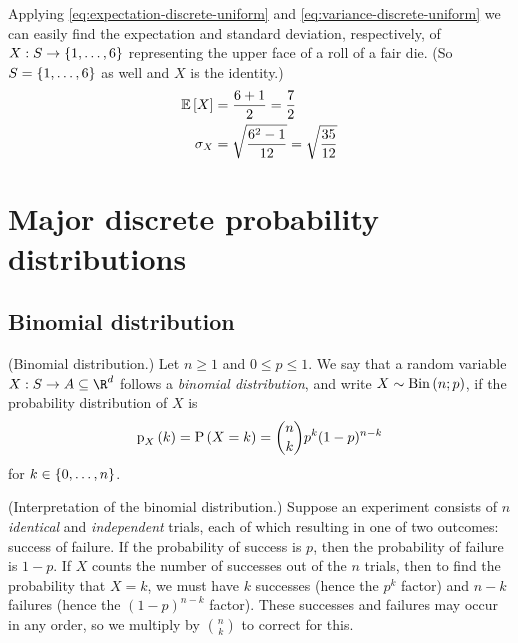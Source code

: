 \documentclass[11pt]{article}
\begin{document}
\begin{rem}
    Applying \eqref{eq:expectation-discrete-uniform} and
    \eqref{eq:variance-discrete-uniform} we can easily find the expectation and
    standard deviation, respectively, of $X : S \to \range{6}$ representing the
    upper face of a roll of a fair die.
    (So $S = \range{6}$ as well and $X$ is the identity.)
    \begin{align*}
        \operatorname{\mathbb{E}}{\left[X\right]}
        &= \frac{6 + 1}{2} = \frac{7}{2} \\
        \sigma_X
        &= \sqrt{
            \frac{6^2 - 1}{12}
        }
        = \sqrt{ \frac{35}{12} }
    \end{align*}
\end{rem}

\section{Major discrete probability distributions}

\subsection{Binomial distribution}

\begin{defn}{(Binomial distribution.)}
    \label{def:binomial-distribution}
    Let $n \geq 1$ and $0 \leq p \leq 1$.
    We say that a random variable $X : S \to A \subseteq \R^d$ follows a
    \emph{binomial distribution}, and write $X \sim \operatorname{Bin}\left(n;p\right)$,
    if the probability distribution of $X$ is
    \begin{equation}
        \label{eq:binomial-distribution}
        \p[X]{k}
        = \P{X = k}
        = \binom{n}{k} p^k (1-p)^{n-k}
    \end{equation}
    for $k \in \range[0]{n}$.
\end{defn}

\begin{rem}{(Interpretation of the binomial distribution.)}
    Suppose an experiment consists of $n$ \emph{identical} and
    \emph{independent} trials, each of which resulting in one of two outcomes:
    success of failure. If the probability of success is $p$, then the
    probability of failure is $1 - p$.
    If $X$ counts the number of successes out of the $n$ trials, then to find
    the probability that $X = k$, we must have $k$ successes (hence the $p^k$
    factor) and $n-k$ failures (hence the $(1-p)^{n-k}$ factor).
    These successes and failures may occur in any order, so we multiply by
    $\binom{n}{k}$ to correct for this.
\end{rem}
\end{document}
